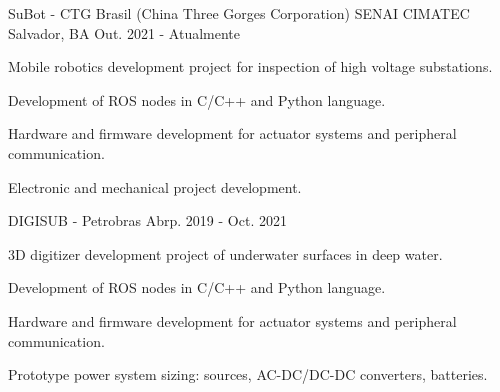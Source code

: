 

\begin{cventries}

  \cventry
    {SuBot - CTG Brasil (China Three Gorges Corporation)} %
    {SENAI CIMATEC} %
    {Salvador, BA} %
    {Out. 2021 - Atualmente} %
    {
      \begin{cvitems} %
        \item {Mobile robotics development project for inspection of high voltage substations.}
        \item {Development of ROS nodes in C/C++ and Python language.}
        \item {Hardware and firmware development for actuator systems and peripheral communication.}
        \item {Electronic and mechanical project development.}
      \end{cvitems}
    }


  \cventry
    {DIGISUB - Petrobras} %
    {} %
    {} %
    {Abrp. 2019 - Oct. 2021} %
    {
      \begin{cvitems} %
        \item {3D digitizer development project of underwater surfaces in deep water.}
        \item {Development of ROS nodes in C/C++ and Python language.}
        \item {Hardware and firmware development for actuator systems and peripheral communication.}
        \item {Prototype power system sizing: sources, AC-DC/DC-DC converters, batteries.}
      \end{cvitems}
    }



\end{cventries}
